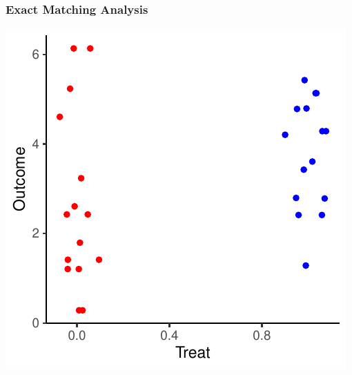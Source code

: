 \documentclass[xcolor=x11names,compress]{beamer}\usepackage[]{graphicx}\usepackage[]{color}
\makeatletter
\def\maxwidth{ %
  \ifdim\Gin@nat@width>\linewidth
    \linewidth
  \else
    \Gin@nat@width
  \fi
}
\newenvironment{knitrout}{}{} %
\renewcommand{\(}{\begin{columns}}
\renewcommand{\)}{\end{columns}}
\newcommand{\<}[1]{\begin{column}{#1}}
\renewcommand{\>}{\end{column}}
\makeatother
\begin{document}
\begin{frame}
\frametitle{Exact Matching Analysis}
\begin{center}
\begin{knitrout}
\color{fgcolor}
\includegraphics[width=\maxwidth]{figure/exact_matching_analysis2-1} 

\end{knitrout}
\end{center}
\end{frame}
\end{document}
